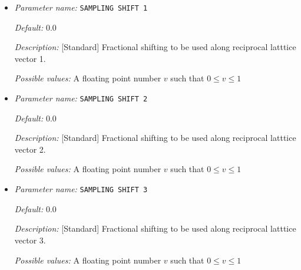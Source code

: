 \begin{itemize}


{\it Default:} 1


{\it Description:} [Standard] Number of Monkhorts-Pack grid points to be used along reciprocal latttice vector 3.


{\it Possible values:} An integer $n$ such that $1\leq n \leq 100$
\item {\it Parameter name:} {\tt SAMPLING SHIFT 1}
\label{parameters:Brillouin zone k point sampling options/Monkhorst_2dPack _28MP_29 grid generation/SAMPLING SHIFT 1}
\label{parameters:Brillouin_20zone_20k_20point_20sampling_20options/Monkhorst_2dPack_20_28MP_29_20grid_20generation/SAMPLING_20SHIFT_201}




{\it Default:} 0.0


{\it Description:} [Standard] Fractional shifting to be used along reciprocal latttice vector 1.


{\it Possible values:} A floating point number $v$ such that $0 \leq v \leq 1$
\item {\it Parameter name:} {\tt SAMPLING SHIFT 2}
\label{parameters:Brillouin zone k point sampling options/Monkhorst_2dPack _28MP_29 grid generation/SAMPLING SHIFT 2}
\label{parameters:Brillouin_20zone_20k_20point_20sampling_20options/Monkhorst_2dPack_20_28MP_29_20grid_20generation/SAMPLING_20SHIFT_202}




{\it Default:} 0.0


{\it Description:} [Standard] Fractional shifting to be used along reciprocal latttice vector 2.


{\it Possible values:} A floating point number $v$ such that $0 \leq v \leq 1$
\item {\it Parameter name:} {\tt SAMPLING SHIFT 3}
\label{parameters:Brillouin zone k point sampling options/Monkhorst_2dPack _28MP_29 grid generation/SAMPLING SHIFT 3}
\label{parameters:Brillouin_20zone_20k_20point_20sampling_20options/Monkhorst_2dPack_20_28MP_29_20grid_20generation/SAMPLING_20SHIFT_203}




{\it Default:} 0.0


{\it Description:} [Standard] Fractional shifting to be used along reciprocal latttice vector 3.


{\it Possible values:} A floating point number $v$ such that $0 \leq v \leq 1$
\end{itemize}

